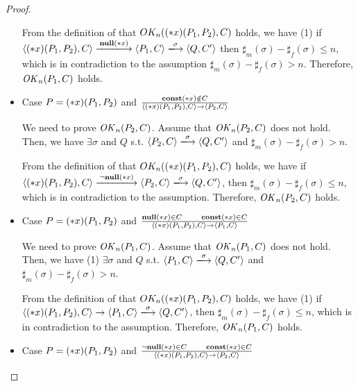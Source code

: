 \begin{proof}
\begin{itemize}
  From the definition of that \(OK_n((*x)(P_1, P_2), C)\) holds, we
  have (1) if \( \langle \Sirx(P_1, P_2), C \rangle
  \xlongrightarrow{\snull} \langle P_1, C \rangle
  \xlongrightarrow{\sigma} \langle Q, C' \rangle \) then
  \(\sharp_m(\sigma) - \sharp_f(\sigma) \le n \), which is in
  contradiction to the assumption \(\sharp_m(\sigma) -
  \sharp_f(\sigma) > n \).  Therefore, \(\mathit{OK}_n(P_1, C)\) holds.

\item Case \( P = (*x)(P_1,P_2) \) and \( \frac{ \mathbf{const}(*x) \notin C}
  { \langle (*x)(P_1, P_2), C \rangle \rightarrow \langle P_2, C
    \rangle } \)

  We need to prove \(\mathit{OK}_n(P_2, C)\).  Assume that \(\mathit{OK}_n(P_2, C)\)
  does not hold. Then, we have \( \exists \sigma \) and \(Q\)
  s.t. \( \langle P_2, C \rangle \xlongrightarrow{\sigma} \langle Q,
  C' \rangle \) and \(\sharp_{m}(\sigma) -
  \sharp_{f}(\sigma) > n\).

  From the definition of that \(OK_n((*x)(P_1, P_2), C)\) holds, we
  have if \( \langle \Sirx(P_1, P_2), C \rangle \xlongrightarrow{\snnull}
  \langle P_2, C \rangle \xlongrightarrow{\sigma} \langle Q, C'
  \rangle \), then \(\sharp_m(\sigma) -
  \sharp_f(\sigma) \le n \), which is in
  contradiction to the assumption.  Therefore, \(\mathit{OK}_n(P_2, C)\)
  holds.

\item Case \( P = (*x)(P_1,P_2) \) and \( \frac{ {\bf null}(*x) \in C
  \quad\quad \mathbf{const}(*x) \in C} { \langle (*x)(P_1, P_2), C \rangle
  \rightarrow \langle P_1, C \rangle } \)

  We need to prove \(\mathit{OK}_n(P_1, C)\).  Assume that \(\mathit{OK}_n(P_1, C)\)
  does not hold. Then, we have (1) \( \exists \sigma \) and \(Q\)
  s.t. \( \langle P_1, C \rangle \xlongrightarrow{\sigma} \langle Q,
  C' \rangle \) and \(\sharp_{m}(\sigma) -
  \sharp_{f}(\sigma) > n\).

  From the definition of that \(OK_n((*x)(P_1, P_2), C)\) holds, we
  have (1) if \( \langle \Sirx(P_1, P_2), C \rangle \rightarrow
  \langle P_1, C \rangle \xlongrightarrow{\sigma} \langle Q, C'
  \rangle \), then \(\sharp_m(\sigma) -
  \sharp_f(\sigma) \le n \), which is in
  contradiction to the assumption.  Therefore, \(\mathit{OK}_n(P_1, C)\)
  holds.

\item Case \( P = (*x)(P_1,P_2) \) and \( \frac{ \neg{\bf null}(*x) \in C
  \quad\quad \mathbf{const}(*x) \in C} { \langle (*x)(P_1, P_2), C \rangle
  \rightarrow \langle P_2, C \rangle } \)


\end{itemize}
\end{proof}
